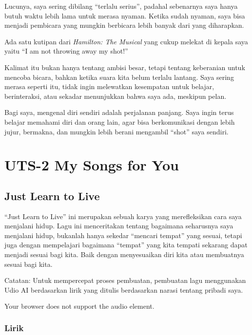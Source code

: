 \documentclass[
  letterpaper,
  DIV=11,
  numbers=noendperiod]{scrreprt}
\begin{document}
Lucunya, saya sering dibilang ``terlalu serius'', padahal sebenarnya
saya hanya butuh waktu lebih lama untuk merasa nyaman. Ketika sudah
nyaman, saya bisa menjadi pembicara yang mungkin berbicara lebih banyak
dari yang diharapkan.

Ada satu kutipan dari \emph{Hamilton: The Musical} yang cukup melekat di
kepala saya yaitu ``I am not throwing away my shot!''

Kalimat itu bukan hanya tentang ambisi besar, tetapi tentang keberanian
untuk mencoba bicara, bahkan ketika suara kita belum terlalu lantang.
Saya sering merasa seperti itu, tidak ingin melewatkan kesempatan untuk
belajar, berinteraksi, atau sekadar menunjukkan bahwa saya ada, meskipun
pelan.

Bagi saya, mengenal diri sendiri adalah perjalanan panjang. Saya ingin
terus belajar memahami diri dan orang lain, agar bisa berkomunikasi
dengan lebih jujur, bermakna, dan mungkin lebih berani mengambil
``shot'' saya sendiri.


\chapter{UTS-2 My Songs for You}\label{uts-2-my-songs-for-you}

\section{Just Learn to Live}\label{just-learn-to-live}

``Just Learn to Live'' ini merupakan sebuah karya yang merefleksikan
cara saya menjalani hidup. Lagu ini menceritakan tentang bagaimana
seharusnya saya menjalani hidup, bukanlah hanya sekedar ``mencari
tempat'' yang sesuai, tetapi juga dengan mempelajari bagaimana
``tempat'' yang kita tempati sekarang dapat menjadi sesuai bagi kita.
Baik dengan menyesuaikan diri kita atau membuatnya sesuai bagi kita.

Catatan: Untuk mempercepat proses pembuatan, pembuatan lagu menggunakan
Udio AI berdasarkan lirik yang ditulis berdasarkan narasi tentang
pribadi saya.

Your browser does not support the audio element.

\subsection{Lirik}\label{lirik}
\end{document}
